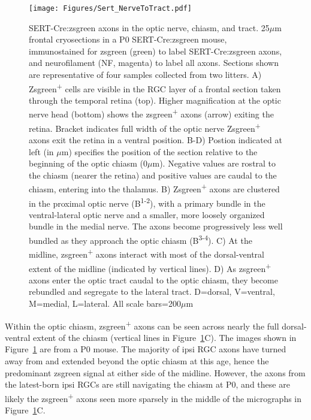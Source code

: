 \begin{figure}[hbtp]
    \begin{center}
        \texttt{[image: Figures/Sert\_NerveToTract.pdf]}
        \caption[SERT-Cre:zsgreen axons in the optic nerve, chiasm, and tract.]
        {SERT-Cre:zsgreen axons in the optic nerve, chiasm, and tract.
        25$\mu$m frontal cryosections in a P0 SERT-Cre:zsgreen mouse, immunostained for zsgreen (green) to label SERT-Cre:zsgreen axons, and neurofilament (NF, magenta) to label all axons.
        Sections shown are representative of four samples collected from two litters. %
        A) Zsgreen\textsuperscript{+} cells are visible in the RGC layer of a frontal section taken through the temporal retina (top).
        Higher magnification at the optic nerve head (bottom) shows the zsgreen\textsuperscript{+} axons (arrow) exiting the retina.
        Bracket indicates full width of the optic nerve
		Zsgreen\textsuperscript{+} axons exit the retina in a ventral position.
        B-D) Postion indicated at left (in $\mu$m) specifies the position of the section relative to the beginning of the optic chiasm (0$\mu$m).
        Negative values are rostral to the chiasm (nearer the retina) and positive values are caudal to the chiasm, entering into the thalamus.
        B) Zsgreen\textsuperscript{+} axons are clustered in the proximal optic nerve (B\textsuperscript{1-2}), with a primary bundle in the ventral-lateral optic nerve and a smaller, more loosely organized bundle in the medial nerve.
        The axons become progressively less well bundled as they approach the optic chiasm (B\textsuperscript{3-4}).
        C) At the midline, zsgreen\textsuperscript{+} axons interact with most of the dorsal-ventral extent of the midline (indicated by vertical lines).
        D) As zsgreen\textsuperscript{+} axons enter the optic tract caudal to the optic chiasm, they become rebundled and segregate to the lateral tract.
        D=dorsal, V=ventral, M=medial, L=lateral.
        All scale bars=200$\mu$m}
        \label{Figures/SertNerveToTract}
    \end{center}
\end{figure}

Within the optic chiasm, zsgreen\textsuperscript{+} axons can be seen across nearly the full dorsal-ventral extent of the chiasm (vertical lines in Figure~\ref{Figures/SertNerveToTract}C).
The images shown in Figure~\ref{Figures/SertNerveToTract} are from a P0 mouse.
The majority of ipsi RGC axons have turned away from and extended beyond the optic chiasm at this age, hence the predominant zsgreen signal at either side of the midline.
However, the axons from the latest-born ipsi RGCs are still navigating the chiasm at P0, and these are likely the zsgreen\textsuperscript{+} axons seen more sparsely in the middle of the micrographs in Figure~\ref{Figures/SertNerveToTract}C.

